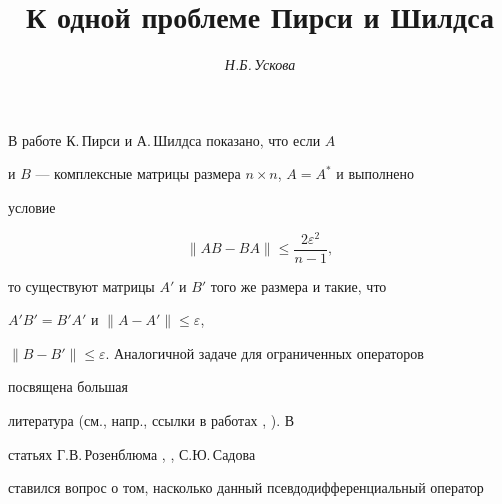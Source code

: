 

\author{\it Н.Б.\,Ускова}


\title{К одной проблеме Пирси и Шилдса}





\date{}







\pagestyle{plain} %













\maketitle













В работе К.\,Пирси и А.\,Шилдса \cite{Pea} показано, что если $A$


и $B$ --- комплексные матрицы размера $n\times n$, $A=A^*$ и выполнено


условие


\begin{equation}


\|AB-BA\|\le \frac{2\varepsilon^2}{n-1},


\end{equation}


то существуют матрицы $A'$ и $B'$ того же размера и такие, что


$A'B'=B'A'$ и $\|A-A'\|\le\varepsilon$,


$\|B-B'\|\le\varepsilon$. Аналогичной задаче для ограниченных операторов


посвящена большая


литература (см., напр., ссылки в работах \cite{Pea}, \cite{Sad}). В


статьях Г.В.\,Розенблюма \cite{Ro1}, \cite{Ro2}, С.Ю.\,Садова \cite{Sad}


ставился вопрос о том, насколько данный псевдодифференциальный оператор


